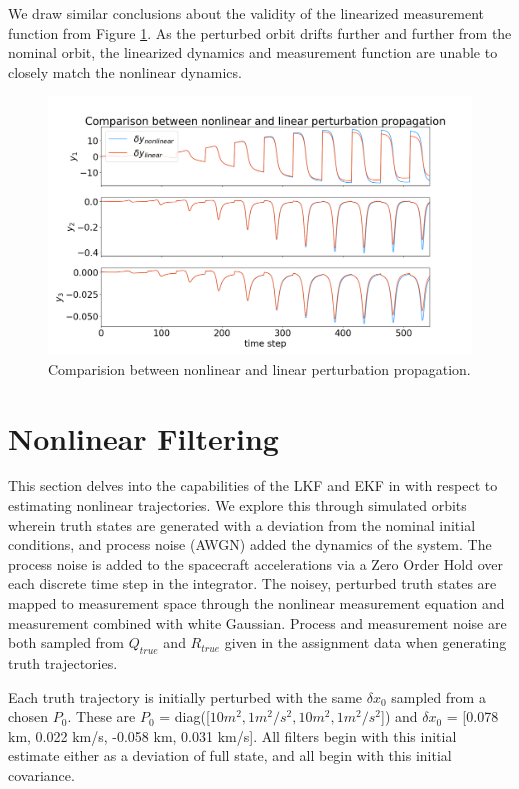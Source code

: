 \documentclass[11pt, a4paper]{article}
\begin{document}
We draw similar conclusions about the validity of the linearized measurement function from Figure \ref{fig:nlvl_m}.
As the perturbed orbit drifts further and further from the nominal orbit, the linearized dynamics and measurement function are unable to closely match the nonlinear dynamics. 
 

\begin{figure}[H]
	\centering
	\includegraphics[width=\textwidth]{./Figures/nonlvl_meas.png}
	\caption{Comparision between nonlinear and linear perturbation propagation.}
	\label{fig:nlvl_m}
\end{figure}


\section{Nonlinear Filtering}
This section delves into the capabilities of the LKF and EKF in with respect to estimating nonlinear trajectories. 
We explore this through simulated orbits wherein truth states are generated with a deviation from the nominal initial conditions, and process noise (AWGN) added the dynamics of the system. 
The process noise is added to the spacecraft accelerations via a Zero Order Hold over each discrete time step in the integrator. 
The noisey, perturbed truth states are mapped to measurement space through the nonlinear measurement equation and measurement combined with white Gaussian.
Process and measurement noise are both sampled from $Q_{true}$ and $R_{true}$ given in the assignment data when generating truth trajectories.

Each truth trajectory is initially perturbed with the same $\delta x_0$ sampled from a chosen $P_0$. These are $P_0$ = diag([$10m^2, 1m^2/s^2, 10m^2, 1m^2/s^2$]) and $\delta x_0$ = [0.078 km, 0.022 km/s, -0.058 km, 0.031 km/s].
All filters begin with this initial estimate either as a deviation of full state, and all begin with this initial covariance. 
\end{document}
